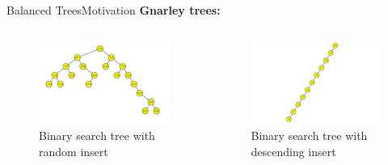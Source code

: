 \begin{frame}{Balanced Trees}{Motivation}
  \textbf{Gnarley trees:}\hfill
  \qrcode[height=5em]{\GnarleyTreesLink}\\
  \vspace{-1.0em}
  \begin{columns}
    \begin{column}[t]{0.5\linewidth}
      \begin{figure}
        \includegraphics[width=\linewidth]{Images/Motivation/BinarySearchTree_Random.png}
        \caption{Binary search tree with random insert~\cite{gnarley_trees}}
        \label{fig:motivation:binary_search_tree_random}
      \end{figure}
    \end{column}
    \begin{column}[t]{0.5\linewidth}
      \begin{figure}
        \includegraphics[width=\linewidth]{Images/Motivation/BinarySearchTree_Ordered.png}
        \caption{Binary search tree with descending insert~\cite{gnarley_trees}}
        \label{fig:motivation:binary_search_tree_ordered}
      \end{figure}
    \end{column}
  \end{columns}
\end{frame}

